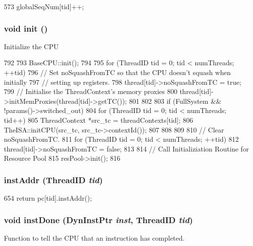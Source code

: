\begin{DoxyCode}
573     { globalSeqNum[tid]++; }
\end{DoxyCode}
\hypertarget{classInOrderCPU_a02fd73d861ef2e4aabb38c0c9ff82947}{
\subsubsection[{init}]{\setlength{\rightskip}{0pt plus 5cm}void init ()}}
\label{classInOrderCPU_a02fd73d861ef2e4aabb38c0c9ff82947}
Initialize the CPU 


\begin{DoxyCode}
792 {
793     BaseCPU::init();
794 
795     for (ThreadID tid = 0; tid < numThreads; ++tid) {
796         // Set noSquashFromTC so that the CPU doesn't squash when initially
797         // setting up registers.
798         thread[tid]->noSquashFromTC = true;
799         // Initialise the ThreadContext's memory proxies
800         thread[tid]->initMemProxies(thread[tid]->getTC());
801     }
802 
803     if (FullSystem && !params()->switched_out) {
804         for (ThreadID tid = 0; tid < numThreads; tid++) {
805             ThreadContext *src_tc = threadContexts[tid];
806             TheISA::initCPU(src_tc, src_tc->contextId());
807         }
808     }
809 
810     // Clear noSquashFromTC.
811     for (ThreadID tid = 0; tid < numThreads; ++tid)
812         thread[tid]->noSquashFromTC = false;
813 
814     // Call Initializiation Routine for Resource Pool
815     resPool->init();
816 }
\end{DoxyCode}
\hypertarget{classInOrderCPU_afae6152cf4b3a51162d6e64247c1ac09}{
\subsubsection[{instAddr}]{ instAddr ({\bf ThreadID} {\em tid})}}
\label{classInOrderCPU_afae6152cf4b3a51162d6e64247c1ac09}



\begin{DoxyCode}
654 { return pc[tid].instAddr(); }
\end{DoxyCode}
\hypertarget{classInOrderCPU_a6b50b034099bb08ba363dfacf1ff4955}{
\subsubsection[{instDone}]{\setlength{\rightskip}{0pt plus 5cm}void instDone ({\bf DynInstPtr} {\em inst}, \/  {\bf ThreadID} {\em tid})}}
\label{classInOrderCPU_a6b50b034099bb08ba363dfacf1ff4955}
Function to tell the CPU that an instruction has completed. 


